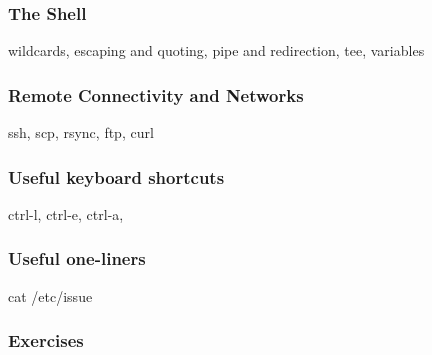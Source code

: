 \documentclass[hyperref={pdfpagelabels=false},12pt]{beamer}
\begin{document}
\begin{frame}
\frametitle{The Shell}
\centering
wildcards, escaping and quoting, pipe and redirection, tee, variables
\end{frame}

\begin{frame}
\frametitle{Remote Connectivity and Networks}
\centering
ssh, scp, rsync, ftp, curl
\end{frame}

\begin{frame}
\frametitle{Useful keyboard shortcuts}
\centering
ctrl-l, ctrl-e, ctrl-a, 
\end{frame}

\begin{frame}
\frametitle{Useful one-liners}
\centering
cat /etc/issue
\end{frame}

\begin{frame}
\frametitle{Exercises}
\end{frame}
\end{document}
